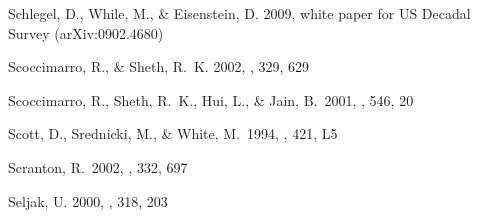 \documentclass[]{emulateapj}
\begin{document}
\begin{thebibliography}{999}
Schlegel, D., While, M., \& Eisenstein, D. 2009, white paper for US
Decadal Survey (arXiv:0902.4680)

Scoccimarro, R., \& Sheth, R.\ K. 2002, \mnras, 329, 629

Scoccimarro, R., Sheth, R.\ K., Hui, L., \& Jain, B.\ 2001, \apj, 546, 20


Scott, D., Srednicki, M., \& White, M.\ 1994, \apjl, 421, L5


Scranton, R.\ 2002, \mnras, 332, 697


Seljak, U. 2000, \mnras, 318, 203


    




\end{thebibliography}
\end{document}
